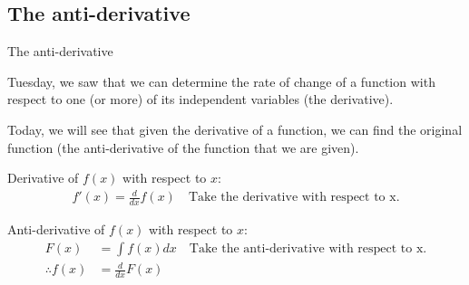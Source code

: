 \documentclass[aspectratio=169,
hyperref={colorlinks,urlcolor=blue}
]{beamer}
\begin{document}
\subsection{The anti-derivative}
\label{subsec:antider}
\begin{bulletframe}{The anti-derivative}
\item Tuesday, we saw that we can determine the rate of change of a function with respect to one (or more) of its independent variables (the derivative).
\item Today, we will see that given the derivative of a function, we can find the original function (the anti-derivative of the function that we are given).
\item Derivative of $f(x)$ with respect to $x$:  
\begin{align*}
f'(x) = \frac{d}{dx} f(x) \quad \text{Take the derivative with respect to x.}
\end{align*}
\item Anti-derivative of $f(x)$ with respect to $x$: 
\begin{align*}
F(x) &= \int f(x) dx \quad \text{Take the anti-derivative with respect to x.}\\
\therefore f(x) &= \frac{d}{dx} F(x)
\end{align*}

\end{bulletframe}


\end{document}
